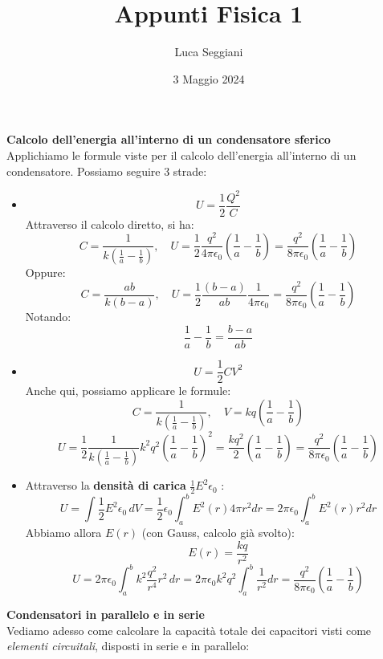 \documentclass[a4paper,12pt]{article}
\title{Appunti Fisica 1}
\author{Luca Seggiani}
\date{3 Maggio 2024}
\begin{document}
\maketitle
\par\smallskip
\textbf{Calcolo dell'energia all'interno di un condensatore sferico} \\
Applichiamo le formule viste per il calcolo dell'energia all'interno di un condensatore. Possiamo seguire 3
strade:
\begin{itemize}
  \item $$ U = \frac{1}{2} \frac{Q^2}{C} $$
    Attraverso il calcolo diretto, si ha:
  $$ C = \frac{1}{k\left(\frac{1}{a}-\frac{1}{b}\right)}, \quad U = \frac{1}{2}\frac{q^2}{4\pi \epsilon_0} \left(\frac{1}{a} - \frac{1}{b}\right) = \frac{q^2}{8\pi\epsilon_0}\left(\frac{1}{a}-\frac{1}{b}\right) $$
  Oppure:
  $$ C = \frac{ab}{k(b-a)}, \quad U = \frac{1}{2} \frac{(b-a)}{ab} \frac{1}{4\pi\epsilon_0} =  \frac{q^2}{8\pi\epsilon_0}\left(\frac{1}{a}-\frac{1}{b}\right)$$
  Notando:
  $$ \frac{1}{a} - \frac{1}{b} = \frac{b-a}{ab} $$
\item $$ U = \frac{1}{2}CV^2 $$
  Anche qui, possiamo applicare le formule:
  $$ C = \frac{1}{k\left(\frac{1}{a} - \frac{1}{b}\right)}, \quad V = kq\left(\frac{1}{a} - \frac{1}{b}\right) $$ 
  $$ U = \frac{1}{2} \frac{1}{k\left( \frac{1}{a} - \frac{1}{b} \right)} k^2q^2\left(\frac{1}{a} - \frac{1}{b}\right)^2 = \frac{kq^2}{2}\left(\frac{1}{a} - \frac{1}{b}\right) = \frac{q^2}{8\pi\epsilon_0}\left(\frac{1}{a}-\frac{1}{b}\right) $$
\item Attraverso la \textbf{densità di carica} $\frac{1}{2}E^2\epsilon_0 $ :
  $$ U = \int \frac{1}{2} E^2 \epsilon_0 \, dV = \frac{1}{2}\epsilon_0 \int_a^b E^2(r) 4 \pi r^2 dr = 2\pi\epsilon_0 \int_a^b E^2(r) r^2 dr $$
  Abbiamo allora $E(r)$ (con Gauss, calcolo già svolto):
  $$ E(r) = \frac{kq}{r^2}$$
  $$ U = 2\pi \epsilon_0 \int_a^b k^2 \frac{q^2}{r^4} r^2 \, dr = 2\pi \epsilon_0 k^2 q^2 \int_a^b \frac{1}{r^2} dr = \frac{q^2}{8\pi \epsilon_0}\left(\frac{1}{a}-\frac{1}{b}\right)$$
\end{itemize}
\par\smallskip
\textbf{Condensatori in parallelo e in serie} \\
Vediamo adesso come calcolare la capacità totale dei capacitori visti come \textit{elementi circuitali}, disposti in serie e in parallelo:
\end{document}
